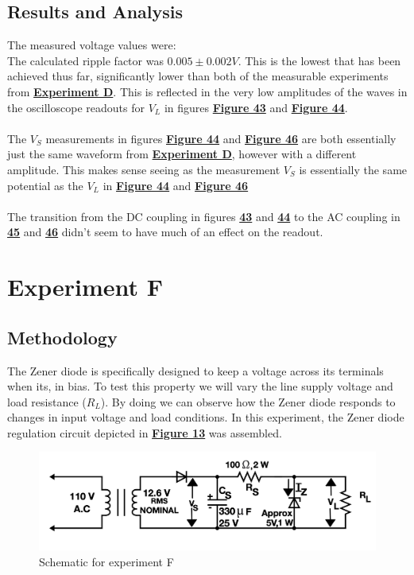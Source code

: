 \documentclass[
	letterpaper
	12pt
]{template}
\newcommand{\bref}[2]{\textbf{\hyperref[#1]{#2}}}
\begin{document}
\subsection{Results and Analysis}
The measured voltage values were:\\


The calculated ripple factor was $0.005 \pm 0.002\unit{V}$. This is the lowest that has been achieved thus far, significantly lower than both of the measurable experiments from \bref{exp::D}{Experiment D}. This is reflected in the very low amplitudes of the waves in the oscilloscope readouts for $V_L$ in figures \bref{data::E}{Figure 43} and \bref{data::E2}{Figure 44}. \\\\
The $V_S$ measurements in figures \bref{data::E}{Figure 44} and \bref{data::E2}{Figure 46} are both essentially just the same waveform from \bref{exp::D}{Experiment D}, however with a different amplitude. This makes sense seeing as the measurement $V_S$ is essentially the same potential as the $V_L$ in \bref{data::E2}{Figure 44} and \bref{data::E2}{Figure 46}\\\\
The transition from the DC coupling in figures \bref{data::E}{43} and \bref{data::E}{44} to the AC coupling in \bref{data::E2}{45} and \bref{data::E2}{46} didn't seem to have much of an effect on the readout.






\section{Experiment F}\label{exp::F}
\subsection{Methodology}\label{method::F}
The Zener diode is specifically designed to keep a voltage across its terminals when its, in bias. To test this property we will vary the line supply voltage and load resistance ($R_L$). By doing we can observe how the Zener diode responds to changes in input voltage and load conditions. In this experiment, the Zener diode regulation circuit depicted in \bref{apparatus::F}{Figure 13} was assembled.
\begin{figure}[H]\label{apparatus::F}
	\centering
	\begin{minipage}[c]{0.45\textwidth}
		\centering
		\includegraphics[width=\textwidth]{figures/F/schematic.png}
		\caption{Schematic for experiment F \\ \protect\cite{labManual}}
	\end{minipage}
\end{figure}
\end{document}
